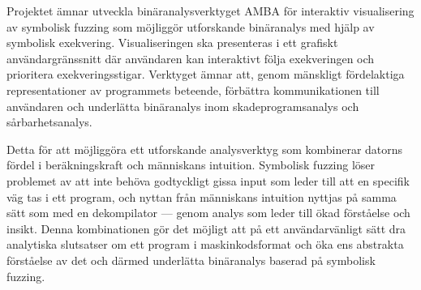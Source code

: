 
Projektet ämnar utveckla binäranalysverktyget AMBA för interaktiv visualisering
av symbolisk fuzzing som möjliggör utforskande binäranalys med hjälp av
symbolisk exekvering. Visualiseringen ska presenteras i ett grafiskt
användargränssnitt där användaren kan interaktivt följa exekveringen och
prioritera exekveringsstigar. Verktyget ämnar att, genom mänskligt fördelaktiga
representationer av programmets beteende, förbättra kommunikationen till
användaren och underlätta binäranalys inom skadeprogramsanalys och
sårbarhetsanalys.

Detta för att möjliggöra ett utforskande analysverktyg som kombinerar datorns
fördel i beräkningskraft och människans intuition. Symbolisk fuzzing löser
problemet av att inte behöva godtyckligt gissa input som leder till att en
specifik väg tas i ett program, och nyttan från människans intuition nyttjas på
samma sätt som med en dekompilator --- genom analys som leder till ökad
förståelse och insikt. Denna kombinationen gör det möjligt att på ett
användarvänligt sätt dra analytiska slutsatser om ett program i
maskinkodsformat och öka ens abstrakta förståelse av det och därmed underlätta
binäranalys baserad på symbolisk fuzzing.
